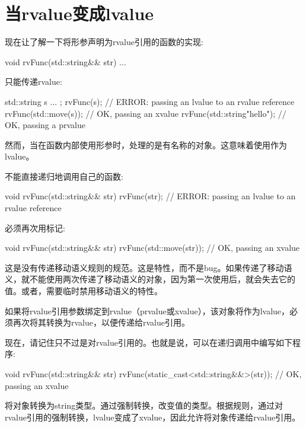 \section{当rvalue变成lvalue}
现在让了解一下将形参声明为rvalue引用的函数的实现:

\begin{cppcode}
void rvFunc(std::string&& str) {
	...
}
\end{cppcode}

只能传递rvalue:

\begin{cppcode}
std::string s{ ... };
rvFunc(s); // ERROR: passing an lvalue to an rvalue reference
rvFunc(std::move(s)); // OK, passing an xvalue
rvFunc(std::string{"hello"}); // OK, passing a prvalue
\end{cppcode}

然而，当在函数内部使用形参时，处理的是有名称的对象。这意味着使用作为lvalue。

不能直接递归地调用自己的函数:

\begin{cppcode}
void rvFunc(std::string&& str) {
	rvFunc(str); // ERROR: passing an lvalue to an rvalue reference
}
\end{cppcode}

必须再次用标记:

\begin{cppcode}
void rvFunc(std::string&& str) {
	rvFunc(std::move(str)); // OK, passing an xvalue
}
\end{cppcode}

这是没有传递移动语义规则的规范。这是特性，而不是bug。如果传递了移动语义，就不能使用两次传递了移动语义的对象，因为第一次使用后，就会失去它的值。或者，需要临时禁用移动语义的特性。

如果将rvalue引用参数绑定到rvalue（prvalue或xvalue），该对象将作为lvalue，必须再次将其转换为rvalue，以便传递给rvalue引用。

现在，请记住只不过是对rvalue引用的。也就是说，可以在递归调用中编写如下程序:

\begin{cppcode}
void rvFunc(std::string&& str) {
	rvFunc(static_cast<std::string&&>(str)); // OK, passing an xvalue
}
\end{cppcode}

将对象转换为string类型。通过强制转换，改变值的类型。根据规则，通过对rvalue引用的强制转换，lvalue变成了xvalue，因此允许将对象传递给rvalue引用。

